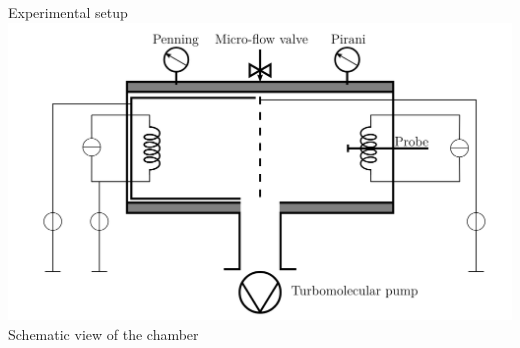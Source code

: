 \documentclass[10pt]{beamer}
\begin{document}
\begin{frame}{Experimental setup}
    \centering
    \includegraphics[width=\textwidth]{../figures/experimental_setup_Willemin_Zahar.png} 
    \\
    \small Schematic view of the chamber\, 
\end{frame}
\end{document}
